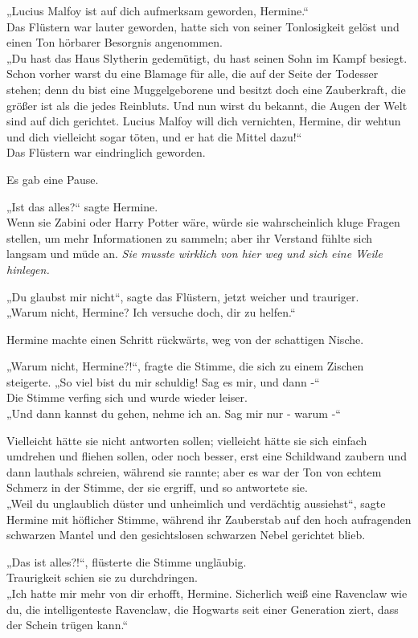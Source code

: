 {„Lucius Malfoy ist auf dich aufmerksam geworden, Hermine.“\\ Das Flüstern war lauter geworden, hatte sich von seiner Tonlosigkeit gelöst und einen Ton hörbarer Besorgnis angenommen.\\ „Du hast das Haus Slytherin gedemütigt, du hast seinen Sohn im Kampf besiegt. Schon vorher warst du eine Blamage für alle, die auf der Seite der Todesser stehen; denn du bist eine Muggelgeborene und besitzt doch eine Zauberkraft, die größer ist als die jedes Reinbluts. Und nun wirst du bekannt, die Augen der Welt sind auf dich gerichtet. Lucius Malfoy will dich vernichten, Hermine, dir wehtun und dich vielleicht sogar töten, und er hat die Mittel dazu!“\\ Das Flüstern war eindringlich geworden.

Es gab eine Pause.

„Ist das alles?“ sagte Hermine.\\ Wenn sie Zabini oder Harry Potter wäre, würde sie wahrscheinlich kluge Fragen stellen, um mehr Informationen zu sammeln; aber ihr Verstand fühlte sich langsam und müde an. \emph{Sie musste wirklich von hier weg und sich eine Weile hinlegen.}

„Du glaubst mir nicht“, sagte das Flüstern, jetzt weicher und trauriger.\\ „Warum nicht, Hermine? Ich versuche doch, dir zu helfen.“

Hermine machte einen Schritt rückwärts, weg von der schattigen Nische.

„Warum nicht, Hermine?!“, fragte die Stimme, die sich zu einem Zischen steigerte. „So viel bist du mir schuldig! Sag es mir, und dann -“\\ Die Stimme verfing sich und wurde wieder leiser.\\ „Und dann kannst du gehen, nehme ich an. Sag mir nur - warum -“

Vielleicht hätte sie nicht antworten sollen; vielleicht hätte sie sich einfach umdrehen und fliehen sollen, oder noch besser, erst eine Schildwand zaubern und dann lauthals schreien, während sie rannte; aber es war der Ton von echtem Schmerz in der Stimme, der sie ergriff, und so antwortete sie.\\ „Weil du unglaublich düster und unheimlich und verdächtig aussiehst“, sagte Hermine mit höflicher Stimme, während ihr Zauberstab auf den hoch aufragenden schwarzen Mantel und den gesichtslosen schwarzen Nebel gerichtet blieb.

„Das ist alles?!“, flüsterte die Stimme ungläubig.\\ Traurigkeit schien sie zu durchdringen.\\ „Ich hatte mir mehr von dir erhofft, Hermine. Sicherlich weiß eine Ravenclaw wie du, die intelligenteste Ravenclaw, die Hogwarts seit einer Generation ziert, dass der Schein trügen kann.“

}
